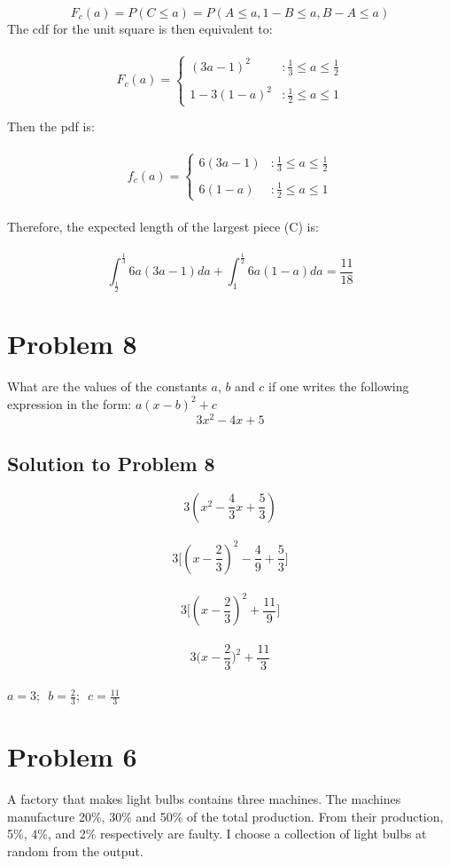 \documentclass{article}
\begin{document}
$$ F_{c}(a) = P(C \le a) = P(A \le a, 1-B \le a, B-A \le a)$$
The cdf for the unit square is then equivalent to: \\\\
\[F_{c}(a) = \left\{
\begin{array}{lr}
(3a-1)^2 & : \frac{1}{3} \le a \le \frac{1}{2} \\\\
1-3(1-a)^2 & : \frac{1}{2} \le a \le 1
\end{array}
\right.
\]

Then the pdf is: \\\\
\[f_{c}(a) = \left\{
\begin{array}{lr}
6(3a-1) & : \frac{1}{3} \le a \le \frac{1}{2} \\\\
6(1-a) & : \frac{1}{2} \le a \le 1
\end{array}
\right.
\]
\\
Therefore, the expected length of the largest piece (C) is: \\\\
$$\int_{\frac{1}{2}}^{\frac{1}{3}} 6a(3a-1)da + \int_{1}^{\frac{1}{2}} 6a(1-a)da = \frac{11}{18}$$


\section{Problem 8}
What are the values of the constants $a$, $b$ and $c$ if one writes the following expression in the form: $ a(x - b)^{2} + c$ \\ 

 \begin{equation}\label{key}
 3x^{2} - 4x + 5
 \end{equation}
 
\subsection{Solution to Problem 8}
$$ 3(x^2 - \frac{4}{3}x + \frac{5}{3})$$ \\
$$ 3 \Big[ (x - \frac{2}{3})^2 -\frac{4}{9} + \frac{5}{3} \Big] $$ \\
$$ 3 \Big[ (x - \frac{2}{3})^2 + \frac{11}{9} \Big]  $$ \\
$$ 3 \big(x - \frac{2}{3}\big)^2 + \frac{11}{3}  $$ \\
$ a =3; \enspace b= \frac{2}{3}; \enspace c= \frac{11}{3} $

\section{Problem 6}
A factory that makes light bulbs contains three machines. The machines manufacture 20\%, 30\% and 50\% of the total production. From their production, 5\%, 4\%, and 2\% respectively are faulty. I choose a collection of light bulbs at random from the output.
\end{document}
